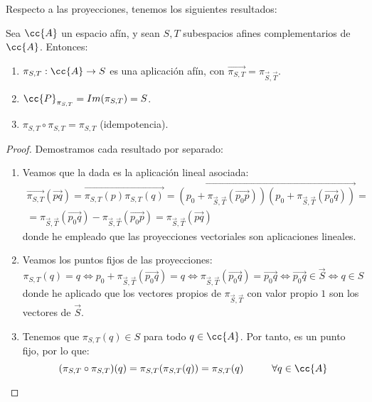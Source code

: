 Respecto a las proyecciones, tenemos los siguientes resultados:
\begin{prop}
    Sea $\cc{A}$ un espacio afín, y sean $S,T$ subespacios afines complementarios de $\cc{A}$. Entonces:
    \begin{enumerate}
        \item $\pi_{S,T}:\cc{A}\to S$ es una aplicación afín, con $\vec{\pi_{S,T}}=\pi_{\vec{S}, \vec{T}}$.
        \item $\cc{P}_{\pi_{S,T}}=Im(\pi_{S,T})=S$.
        \item $\pi_{S,T}\circ \pi_{S,T} =\pi_{S,T}$ (idempotencia).
    \end{enumerate}
\end{prop}
\begin{proof} Demostramos cada resultado por separado:
\begin{enumerate}
    \item Veamos que la dada es la aplicación lineal asociada:
    \begin{multline*}
        \vec{\pi_{S,T}}(\vec{pq}) = \vec{\pi_{S,T}(p)\pi_{S,T}(q)} = \vec{(p_0+\pi_{\vec{S}, \vec{T}}(\vec{p_0p}))(p_0+\pi_{\vec{S}, \vec{T}}(\vec{p_0q}))} =\\= \pi_{\vec{S}, \vec{T}}(\vec{p_0q})-\pi_{\vec{S}, \vec{T}}(\vec{p_0p}) = \pi_{\vec{S}, \vec{T}}(\vec{pq})
    \end{multline*}
    donde he empleado que las proyecciones vectoriales son aplicaciones lineales.

    \item Veamos los puntos fijos de las proyecciones:
    \begin{equation*}
        \pi_{S,T}(q)=q \Longleftrightarrow p_0 + \pi_{\vec{S}, \vec{T}}(\vec{p_0q}) = q
        \Longleftrightarrow \pi_{\vec{S}, \vec{T}}(\vec{p_0q}) = \vec{p_0q}
        \Longleftrightarrow \vec{p_0q}\in \vec{S}
        \Longleftrightarrow q\in S
    \end{equation*}
    donde he aplicado que los vectores propios de $\pi_{\vec{S}, \vec{T}}$ con valor propio $1$ son los vectores de $\vec{S}$.

    \item Tenemos que $\pi_{S,T}(q)\in S$ para todo $q\in \cc{A}$. Por tanto, es un punto fijo, por lo que:
    \begin{equation*}
        (\pi_{S,T}\circ \pi_{S,T})(q) = \pi_{S,T}(\pi_{S,T}(q)) = \pi_{S,T}(q) \hspace{1cm} \forall q\in \cc{A}
    \end{equation*}
\end{enumerate}
\end{proof}

